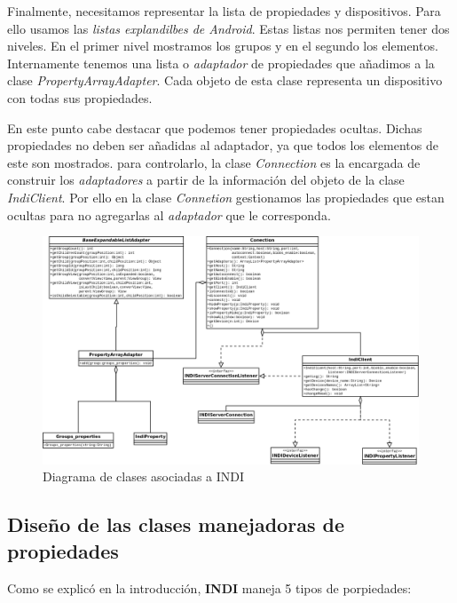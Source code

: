 \bigskip
Finalmente, necesitamos representar la lista de propiedades y dispositivos. Para ello usamos las \textit{listas explandilbes de Android}. Estas listas nos permiten tener dos niveles. En el primer nivel mostramos los grupos y en el segundo los elementos. Internamente tenemos una lista o \textit{adaptador} de propiedades que añadimos a la clase \textit{PropertyArrayAdapter}. Cada objeto de esta clase representa un dispositivo con todas sus propiedades. 

\bigskip
En este punto cabe destacar que podemos tener propiedades ocultas. Dichas propiedades no deben ser añadidas al adaptador, ya que todos los elementos de este son mostrados. para controlarlo, la clase \textit{Connection} es la encargada de construir los \textit{adaptadores} a partir de la información del objeto de la clase \textit{IndiClient}. Por ello en la clase \textit{Connetion} gestionamos las propiedades que estan ocultas para no agregarlas al \textit{adaptador} que le corresponda.


\bigskip
\begin{figure}[!ht]
  \begin{center}
  \includegraphics[width=1\textwidth]{../images/indi_diag_clases.png}
  \caption{Diagrama de clases asociadas a INDI}
  \label{fig:diag_indi_clases}
  \end{center}
\end{figure}


\newpage
\subsection{Diseño de las clases manejadoras de propiedades}

Como se explicó en la introducción, \textbf{INDI} maneja 5 tipos de porpiedades:


